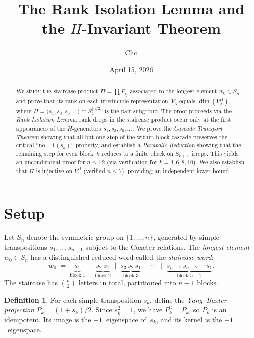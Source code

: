 \documentclass[12pt]{article}
\title{The Rank Isolation Lemma and the $H$-Invariant Theorem}
\author{Clio}
\date{April 15, 2026}
\theoremstyle{definition}
\newtheorem{definition}[theorem]{Definition}
\theoremstyle{remark}
\begin{document}
\maketitle

\begin{abstract}
We study the staircase product $\Pi = \prod P_{i_j}$ associated to the longest
element $w_0 \in S_n$ and prove that its rank on each irreducible
representation~$V_\lambda$ equals $\dim(V_\lambda^H)$, where
$H = \langle s_1, s_3, s_5, \ldots \rangle \cong S_2^{\lfloor n/2 \rfloor}$
is the pair subgroup.  The proof proceeds via the \emph{Rank Isolation Lemma}:
rank drops in the staircase product occur only at the first appearances of the
$H$-generators $s_1, s_3, s_5, \ldots$\,.  We prove the \emph{Cascade Transport
Theorem} showing that all but one step of the within-block cascade preserves the
critical ``no $-1(s_k)$'' property, and establish a \emph{Parabolic Reduction}
showing that the remaining step for even block~$k$ reduces to a finite check on
$S_{k+1}$~irreps.  This yields an unconditional proof for $n \le 12$ (via
verification for $k = 4, 6, 8, 10$).  We also establish that $\Pi$ is injective
on $V^H$ (verified $n \le 7$), providing an independent lower bound.
\end{abstract}

\section{Setup}

Let $S_n$ denote the symmetric group on $\{1, \ldots, n\}$, generated by simple
transpositions $s_1, \ldots, s_{n-1}$ subject to the Coxeter relations.  The
\emph{longest element} $w_0 \in S_n$ has a distinguished reduced word called the
\emph{staircase word}:
\[
  w_0 \;=\; \underbrace{s_1}_{\text{block 1}} \;\mid\;
  \underbrace{s_2\, s_1}_{\text{block 2}} \;\mid\;
  \underbrace{s_3\, s_2\, s_1}_{\text{block 3}} \;\mid\; \cdots \;\mid\;
  \underbrace{s_{n-1}\, s_{n-2}\, \cdots\, s_1}_{\text{block $n{-}1$}}.
\]
The staircase has $\binom{n}{2}$ letters in total, partitioned into $n-1$ blocks.

\begin{definition}
For each simple transposition $s_k$, define the \emph{Yang--Baxter projection}
$P_k = (1 + s_k)/2$.
Since $s_k^2 = 1$, we have $P_k^2 = P_k$, so $P_k$ is an idempotent.  Its image
is the $+1$~eigenspace of~$s_k$, and its kernel is the $-1$~eigenspace.
\end{definition}
\end{document}
